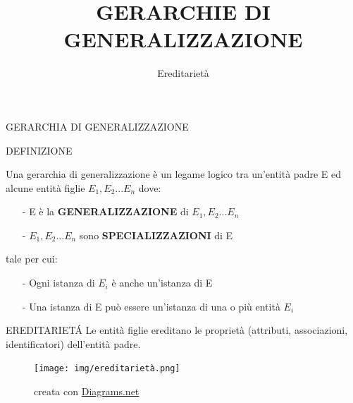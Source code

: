 \documentclass[aspectratio=1610]{beamer}
\title{GERARCHIE DI GENERALIZZAZIONE}
\subtitle{Ereditarietà}
\date{}
\institute{\textit{
        Fonti:
        \begin{itemize}
            \item[-] \href{https://it.wikipedia.org/wiki/Modello_E-R}{Wikipedia}
        \end{itemize}
    }
}
\begin{document}
\begin{frame}
    \titlepage
\end{frame}

\begin{frame}{GERARCHIA DI GENERALIZZAZIONE}
    \begin{alertblock}{DEFINIZIONE}
        \begin{minipage}{0.98\linewidth}
            \justifying
            Una gerarchia di generalizzazione è un legame logico tra un'entità padre E ed alcune entità figlie $E_1, E_2 ... E_n$ dove:
            \begin{itemize}
                \item[-] E è la \textbf{GENERALIZZAZIONE} di $E_1, E_2 ... E_n$
                \item[-] $E_1, E_2 ... E_n$ sono \textbf{SPECIALIZZAZIONI} di E
            \end{itemize}
            tale per cui:
            \begin{itemize}
                \item[-] Ogni istanza di $E_i$ è anche un'istanza di E
                \item[-] Una istanza di E può essere un'istanza di una o più entità $E_i$
            \end{itemize}
        \end{minipage}
    \end{alertblock}
\end{frame}

\begin{frame}{EREDITARIET\'A}
    Le entità figlie ereditano le proprietà (attributi, associazioni, identificatori) dell'entità padre.
    \begin{figure}
        \texttt{[image: img/ereditarietà.png]}
        \caption{{creata con \href{https://app.diagrams.net/}{Diagrams.net}}}
    \end{figure}
\end{frame}
\end{document}
